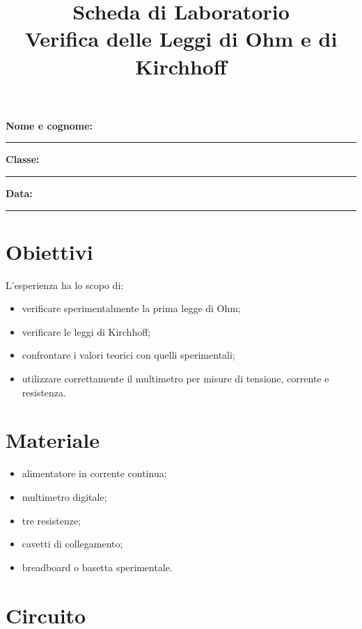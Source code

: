 \documentclass[a4paper,12pt]{article}
\title{Scheda di Laboratorio\\
Verifica delle Leggi di Ohm e di Kirchhoff}
\author{}
\date{}
\begin{document}
\maketitle

\vspace{0.5cm}

\noindent
\textbf{Nome e cognome:} \rule{8cm}{0.4pt}

\vspace{0.3cm}

\noindent
\textbf{Classe:} \rule{3cm}{0.4pt}
\hfill
\textbf{Data:} \rule{3cm}{0.4pt}

\vspace{1cm}

\section*{Obiettivi}

L’esperienza ha lo scopo di:

\begin{itemize}[itemsep=0pt, topsep=1pt]
    \item verificare sperimentalmente la prima legge di Ohm;
    \item verificare le leggi di Kirchhoff;
    \item confrontare i valori teorici con quelli sperimentali;
    \item utilizzare correttamente il multimetro per misure di tensione, corrente e resistenza.
\end{itemize}

\section*{Materiale}

\begin{itemize}[itemsep=0pt, topsep=1pt]
    \item alimentatore in corrente continua;
    \item multimetro digitale;
    \item tre resistenze;
    \item cavetti di collegamento;
    \item breadboard o basetta sperimentale.
\end{itemize}

\section*{Circuito}
\end{document}
